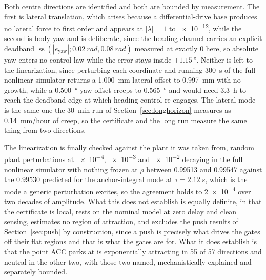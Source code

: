 \documentclass[a4paper,fleqn]{cas-dc}
\begin{document}
Both centre directions are identified and both are bounded by measurement. The first is lateral translation, which arises because a differential-drive base produces no lateral force to first order and appears at $|\lambda|{=}1$ to \num{e-12}, while the second is body yaw and is deliberate, since the heading channel carries an explicit deadband $\operatorname{ss}(|e_{\text{yaw}}|;\SI{0.02}{rad},\SI{0.08}{rad})$ measured at exactly \num{0} here, so absolute yaw enters no control law while the error stays inside $\pm\SI{1.15}{\degree}$. Neither is left to the linearization, since perturbing each coordinate and running \SI{300}{s} of the full nonlinear simulator returns a \SI{1.000}{mm} lateral offset to \SI{0.997}{mm} with no growth, while a \SI{0.500}{\degree} yaw offset creeps to \SI{0.565}{\degree} and would need \SI{3.3}{h} to reach the deadband edge at which heading control re-engages. The lateral mode is the same one the \SI{30}{min} run of Section~\ref{sec:longhorizon} measures as \SI{0.14}{mm/hour} of creep, so the certificate and the long run measure the same thing from two directions.

The linearization is finally checked against the plant it was taken from, random plant perturbations at \num{e-4}, \num{e-3} and \num{e-2} decaying in the full nonlinear simulator with nothing frozen at $\rho$ between \num{0.99513} and \num{0.99547} against the \num{0.99530} predicted for the anchor-integral mode at $\tau{=}\SI{2.12}{s}$, which is the mode a generic perturbation excites, so the agreement holds to \num{2e-4} over two decades of amplitude. What this does not establish is equally definite, in that the certificate is local, rests on the nominal model at zero delay and clean sensing, estimates no region of attraction, and excludes the push results of Section~\ref{sec:push} by construction, since a push is precisely what drives the gates off their flat regions and that is what the gates are for. What it does establish is that the point ACC parks at is exponentially attracting in \num{55} of \num{57} directions and neutral in the other two, with those two named, mechanistically explained and separately bounded.
\end{document}
